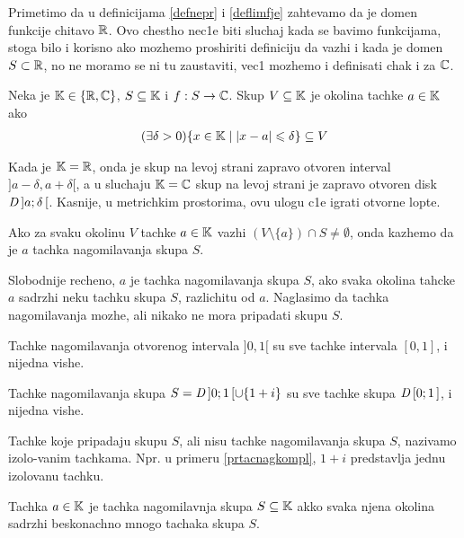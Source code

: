 \documentclass[../maing.tex]{subfiles}
\begin{document}
    
    Primetimo da u definicijama \ref{defnepr} i \ref{deflimfje} zahtevamo da je domen funkcije chitavo $\mathbb{R}$.
    Ovo chestho nec1e biti sluchaj kada se bavimo funkcijama, stoga bilo i korisno ako mozhemo proshiriti definiciju da vazhi i kada je domen  $S \subset \mathbb{R}$,
    no ne moramo se ni tu zaustaviti, vec1 mozhemo i definisati chak i za $\mathbb{C}$.
    
    \begin{de}
    Neka je $\mathbb{K}\in \{\mathbb{R}, \mathbb{C}\}$, $S\subseteq\mathbb{K}$ i $f:S \to \mathbb{C}$. Skup $V\subseteq \mathbb{K}$ je okolina tachke $a\in \mathbb{K}$ ako 
    \begin{align}
        \label{defokolina}
        (\exists \delta > 0 )\{x\in \mathbb{K} \mid |x-a|\leqslant \delta\}\subseteq V
    \end{align}
    \end{de}

    Kada je $\mathbb{K}=\mathbb{R}$, onda je skup na levoj strani zapravo otvoren interval $]a-\delta,a+\delta[$,
    a u sluchaju $\mathbb{K}=\mathbb{C}$ skup na levoj strani je zapravo otvoren disk $\mathit{D}\,]a;\delta\,[$. Kasnije, u metrichkim prostorima, ovu ulogu c1e igrati otvorne lopte.
    
    \begin{de}
        Ako za svaku okolinu $V$ tachke $a\in \mathbb{K}$ vazhi $(V\setminus \{a\})\cap S \neq \emptyset$, onda kazhemo da je $a$ tachka nagomilavanja skupa $S$.
    \end{de}

    Slobodnije recheno, $a$ je tachka nagomilavanja skupa $S$, ako svaka okolina tahcke $a$ sadrzhi neku tachku skupa $S$, razlichitu od $a$. 
    Naglasimo da tachka nagomilavanja mozhe, ali nikako ne mora pripadati skupu $S$. 

    \begin{pr}
        Tachke nagomilavanja otvorenog intervala $]0,1[$ su sve tachke intervala $[0,1]$, i nijedna vishe.
    \end{pr}
    \begin{pr}
        \label{prtacnagkompl}
        Tachke nagomilavanja skupa $S=\mathit{D}\,]0;1\,[\cup \{1+i\}$ su sve tachke skupa $\mathit{D}\,[0;1\,]$, i nijedna vishe.
    \end{pr}

    Tachke koje pripadaju skupu $S$, ali nisu tachke nagomilavanja skupa $S$, nazivamo izolo-vanim tachkama.
    Npr. u  primeru \ref{prtacnagkompl}, $1+i$ predstavlja jednu izolovanu tachku.

    \begin{tvr}
        Tachka $a \in \mathbb{K}$ je tachka nagomilavnja skupa $S \subseteq \mathbb{K}$ akko svaka njena okolina sadrzhi beskonachno mnogo tachaka skupa $S$.
    \end{tvr}
\end{document}
